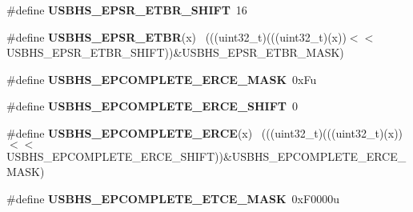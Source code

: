 \begin{DoxyCompactItemize}
\item 
\hypertarget{group___u_s_b_h_s___register___masks_ga6f65eb92102267f10dd83b7eea2f32e9}{}\#define {\bfseries U\+S\+B\+H\+S\+\_\+\+E\+P\+S\+R\+\_\+\+E\+T\+B\+R\+\_\+\+S\+H\+I\+F\+T}~16\label{group___u_s_b_h_s___register___masks_ga6f65eb92102267f10dd83b7eea2f32e9}

\item 
\hypertarget{group___u_s_b_h_s___register___masks_gafe15551710fd00265aad13f14a458644}{}\#define {\bfseries U\+S\+B\+H\+S\+\_\+\+E\+P\+S\+R\+\_\+\+E\+T\+B\+R}(x)                                          ~(((uint32\+\_\+t)(((uint32\+\_\+t)(x))$<$$<$U\+S\+B\+H\+S\+\_\+\+E\+P\+S\+R\+\_\+\+E\+T\+B\+R\+\_\+\+S\+H\+I\+F\+T))\&U\+S\+B\+H\+S\+\_\+\+E\+P\+S\+R\+\_\+\+E\+T\+B\+R\+\_\+\+M\+A\+S\+K)\label{group___u_s_b_h_s___register___masks_gafe15551710fd00265aad13f14a458644}

\item 
\hypertarget{group___u_s_b_h_s___register___masks_ga9ea5492082566a6552ccd497602826d5}{}\#define {\bfseries U\+S\+B\+H\+S\+\_\+\+E\+P\+C\+O\+M\+P\+L\+E\+T\+E\+\_\+\+E\+R\+C\+E\+\_\+\+M\+A\+S\+K}~0x\+Fu\label{group___u_s_b_h_s___register___masks_ga9ea5492082566a6552ccd497602826d5}

\item 
\hypertarget{group___u_s_b_h_s___register___masks_gac2d688bc89d463ab276af72d78687857}{}\#define {\bfseries U\+S\+B\+H\+S\+\_\+\+E\+P\+C\+O\+M\+P\+L\+E\+T\+E\+\_\+\+E\+R\+C\+E\+\_\+\+S\+H\+I\+F\+T}~0\label{group___u_s_b_h_s___register___masks_gac2d688bc89d463ab276af72d78687857}

\item 
\hypertarget{group___u_s_b_h_s___register___masks_ga7e9e3d655ec4b21bbda852a7cdfb7e7a}{}\#define {\bfseries U\+S\+B\+H\+S\+\_\+\+E\+P\+C\+O\+M\+P\+L\+E\+T\+E\+\_\+\+E\+R\+C\+E}(x)                              ~(((uint32\+\_\+t)(((uint32\+\_\+t)(x))$<$$<$U\+S\+B\+H\+S\+\_\+\+E\+P\+C\+O\+M\+P\+L\+E\+T\+E\+\_\+\+E\+R\+C\+E\+\_\+\+S\+H\+I\+F\+T))\&U\+S\+B\+H\+S\+\_\+\+E\+P\+C\+O\+M\+P\+L\+E\+T\+E\+\_\+\+E\+R\+C\+E\+\_\+\+M\+A\+S\+K)\label{group___u_s_b_h_s___register___masks_ga7e9e3d655ec4b21bbda852a7cdfb7e7a}

\item 
\hypertarget{group___u_s_b_h_s___register___masks_gaf13124d7500d32aa712b9002165d8ff2}{}\#define {\bfseries U\+S\+B\+H\+S\+\_\+\+E\+P\+C\+O\+M\+P\+L\+E\+T\+E\+\_\+\+E\+T\+C\+E\+\_\+\+M\+A\+S\+K}~0x\+F0000u\label{group___u_s_b_h_s___register___masks_gaf13124d7500d32aa712b9002165d8ff2}


\end{DoxyCompactItemize}
